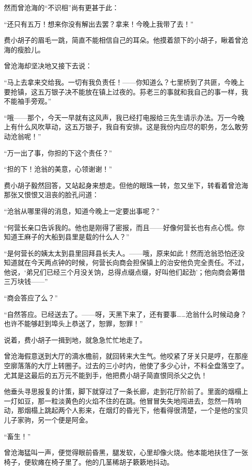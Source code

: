\par 然而曾沧海的“不识相”尚有更甚于此：
\par “还只有五万！想来你没有解出去罢？拿来！今晚上我带了去！”
\par 费小胡子的眉毛一跳，简直不能相信自己的耳朵。他摸着颔下的小胡子，瞅着曾沧海的瘦脸儿。
\par 曾沧海却坚决地又接下去说：
\par “马上去拿来交给我。一切有我负责任！——你知道么？七里桥到了共匪，今晚上要抢镇，这五万银子决不能放在镇上过夜的。荪老三的事就和我自己的事一样，我不能袖手旁观。”
\par “哦——那个，今天一早就有这风声，我已经打电报给三先生请示办法。万一今晚上有什么风吹草动，这五万银子，我自有安排。这是我份内应尽的职务，怎么敢劳动沧翁呢！”
\par “万一出了事，你担的下这个责任？”
\par “担的下！沧翁的美意，心领谢谢！”
\par 费小胡子毅然回答，又站起身来想走。但他的眼珠一转，忽又坐下，转看着曾沧海那张又恨恨又沮丧的脸孔问道：
\par “沧翁从哪里得的消息，知道今晚上一定要出事呢？”
\par “何营长亲口告诉我的。他也是刚得了密报，而且——好像何营长也有点心慌。你知道王麻子的大船到县里是载的什么人？”
\par “是何营长的姨太太到县里回拜县长夫人。——哦，原来如此！然而沧翁恐怕还没知道就在今天两点钟的时候，何营长向商会担保镇上的治安他负完全责任。不过，他说，‘弟兄们已经三个月没关饷，总得点缀点缀，好叫他们起劲’；他向商会筹借三万块钱——”
\par “商会答应了么？”
\par “自然答应。已经送去了。——呀，天黑下来了，还有要事……沧翁什么时候动身？也许不能够赶到埠头上恭送了，恕罪，恕罪！”
\par 说着，费小胡子一揖到地，就急急忙忙地走了。
\par 曾沧海假意送到大厅的滴水檐前，就回转来大生气。他咬紧了牙关只是哼，在那座空廓落落的大厅上转圈子。过去的三小时内，他使了多少心计，不料全盘落空了。尤其是这最后的五万元不能到手，他把费小胡子简直恨同杀父之仇！
\par 他垂头寻思报复的计策，脚下就穿过了一条长廊，走到花厅阶前了。里面的烟榻上一灯如豆，那一粒淡黄色的火焰不住的在跳。他冒冒失失地闯进去，忽然一阵响动，那烟榻上跳起两个人影来，在烟灯的昏光下，他看得很清楚，一个是他的宝贝儿子家驹，另一个便是阿金。
\par “畜生！”
\par 曾沧海猛叫一声，便觉得眼前昏黑，腿发软，心里却像火烧。他本能地扶住了一张椅子，便软瘫在椅子里了。他的几茎稀胡子簌簌地抖动。
